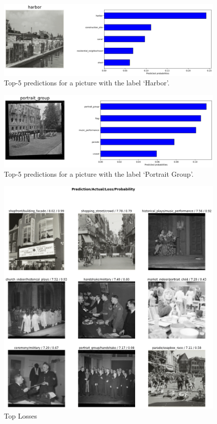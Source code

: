 \documentclass[a4paper,twoside]{article}
\begin{document}
\begin{figure}
	\centering
 	\includegraphics[width=\linewidth]{figures/harbor_example.png}
 	\caption{Top-5 predictions for a picture with the label `Harbor'.}
 	\label{fig:harbor_example}
\end{figure}


\begin{figure}
	\centering
 	\includegraphics[width=\linewidth]{figures/portrait_group.png}
 	\caption{Top-5 predictions for a picture with the label `Portrait Group'.}
 	\label{fig:portrait_group_example}
\end{figure}


\begin{figure}
	\centering
 	\includegraphics[width=\linewidth]{figures/top_losses.png}
 	\caption{Top Losses}
 	\label{fig:top_losses}
\end{figure}
\end{document}

